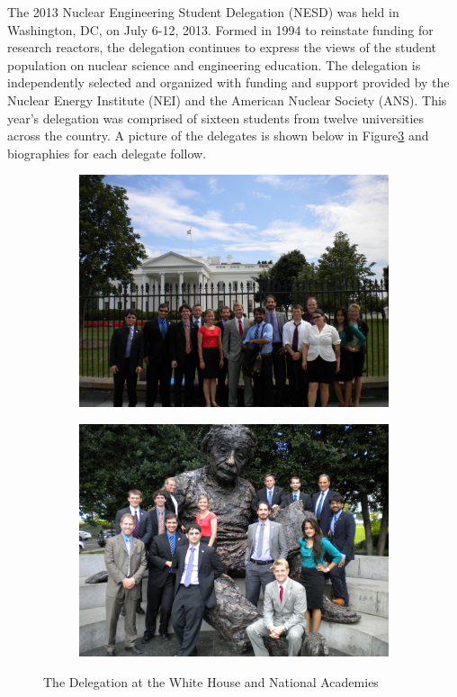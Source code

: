The 2013 Nuclear Engineering Student Delegation (NESD) was held in Washington,
DC, on July 6-12, 2013. Formed in 1994 to reinstate funding for research
reactors, the delegation continues to express the views of the student
population on nuclear science and engineering education. The delegation is
independently selected and organized with funding and support provided by the
Nuclear Energy Institute (NEI) and the American Nuclear Society (ANS). This
year’s delegation was comprised of sixteen students from twelve universities
across the country. A picture of the delegates is shown below in
Figure\ref{fig:delegates} and biographies for each delegate follow.

\begin{figure}[h]
\centering
\begin{subfigure}{.5 \textwidth}
  \centering
  \includegraphics[width=.95 \linewidth]{NESD_WH.jpg}
  \label{fig:whitehouse}
\end{subfigure}%
\begin{subfigure}{.5\textwidth}
  \centering
  \includegraphics[width=.95 \linewidth]{NESD_Ein.jpg}
  \label{fig:einstein}
\end{subfigure}
\caption{The Delegation at the White House and National Academies}
\label{fig:delegates}
\end{figure}

